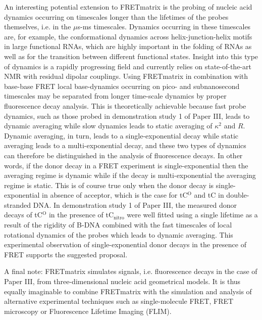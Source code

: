  An interesting potential extension to FRETmatrix is the probing of nucleic acid dynamics occurring on timescales longer than the lifetimes of the probes themselves, i.e. in the $\mu$s-ms timescales. Dynamics occurring in these timescales are, for example, the conformational dynamics across helix-junction-helix motifs in large functional RNAs, which are highly important in the folding of RNAs as well as for the transition between different functional states.\cite{Dethoff2012} Insight into this type of dynamics is a rapidly progressing field and currently relies on state-of-the-art NMR with residual dipolar couplings.\cite{Bothe2011} Using FRETmatrix in combination with base-base FRET local base-dynamics occurring on pico- and subnanosecond timescales may be separated from longer time-scale dynamics by proper fluorescence decay analysis. This is theoretically achievable because fast probe dynamics, such as those probed in demonstration study 1 of Paper III, leads to dynamic averaging while slow dynamics leads to static averaging of $\kappa^2$ and $R$. Dynamic averaging, in turn, leads to a single-exponential decay while static averaging leads to a multi-exponential decay, and these two types of dynamics can therefore be distinguished in the analysis of fluorescence decays. In other words, if the donor decay in a FRET experiment is single-exponential then the averaging regime is dynamic while if the decay is multi-exponential the averaging regime is static. This is of course true only when the donor decay is single-exponential in absence of acceptor, which is the case for tC$^\mathrm{O}$ and tC in double-stranded DNA. In demonstration study 1 of Paper III, the measured donor decays of tC$^\mathrm{O}$ in the presence of tC$_\mathrm{nitro}$ were well fitted using a single lifetime as a result of the rigidity of B-DNA combined with the fast timescales of local rotational dynamics of the probes which leads to dynamic averaging. This experimental observation of single-exponential donor decays in the presence of FRET supports the suggested proposal.

 A final note: FRETmatrix simulates signals, i.e. fluorescence decays in the case of Paper III, from three-dimensional nucleic acid geometrical models. It is thus equally imaginable to combine FRETmatrix with the simulation and analysis of alternative experimental techniques such as single-molecule FRET, FRET microscopy or Fluorescence Lifetime Imaging (FLIM).
